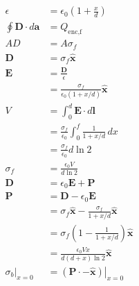 \documentclass{article}
\renewcommand{\vec}[1]{\boldsymbol{\mathbf{#1}}}
\newcommand{\uvec}[1]{\hat{\vec{#1}}}
\begin{document}
\subsection{}

\begin{align*}
  \epsilon                        & = \epsilon_0 \left( 1 + \frac{x}{d} \right)                      \\
  \oint \vec{D} \cdot d \vec{a}   & = Q_\text{enc,f}                                                 \\
  A D                             & = A \sigma_f                                                     \\
  \vec{D}                         & = \sigma_f \uvec{x}                                              \\
  \vec{E}                         & = \frac{\vec{D}}{\epsilon}                                       \\
                                  & = \frac{\sigma_f}{\epsilon_0 (1 + x / d)} \uvec{x}               \\
  V                               & = \int_0^d \vec{E} \cdot d \vec{l}                               \\
                                  & = \frac{\sigma_f}{\epsilon_0} \int_0^f \frac{1}{1 + x / d} \,d x \\
                                  & = \frac{\sigma_f}{\epsilon_0} d \ln 2                            \\
  \sigma_f                        & = \frac{\epsilon_0 V}{d \ln 2}                                   \\
  \vec{D}                         & = \epsilon_0 \vec{E} + \vec{P}                                   \\
  \vec{P}                         & = \vec{D} - \epsilon_0 \vec{E}                                   \\
                                  & = \sigma_f \uvec{x} - \frac{\sigma_f}{1 + x / d} \uvec{x}        \\
                                  & = \sigma_f \left( 1 - \frac{1}{1 + x / d} \right) \uvec{x}       \\
                                  & = \frac{\epsilon_0 V x}{d (d + x) \ln 2} \uvec{x}                \\
  \left. \sigma_b \right|_{x = 0} & = \left. (\vec{P} \cdot -\uvec{x}) \right|_{x = 0}               \\

\end{align*}
\end{document}

